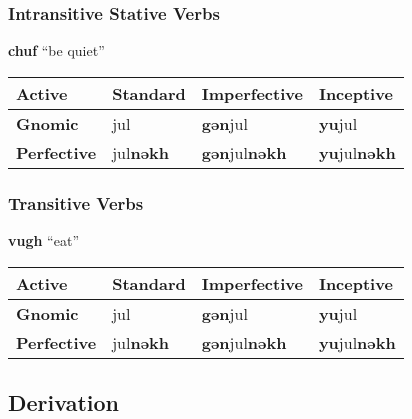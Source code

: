 \documentclass[oneside]{book}
\begin{document}
\subsubsection{Intransitive Stative Verbs}

\textbf{chuf} ``be quiet''

\begin{center}
\begin{tabular}{|l|l|l|l|}\hline
\textbf{Active}&\textbf{Standard}&\textbf{Imperfective}&\textbf{Inceptive}\\\hline
\textbf{Gnomic}&jul&\textbf{gǝn}jul&\textbf{yu}jul\\\hline
\textbf{Perfective}&jul\textbf{nǝkh}&\textbf{gǝn}jul\textbf{nǝkh}&\textbf{yu}jul\textbf{nǝkh}\\\hline
\end{tabular}
\end{center}

\subsubsection{Transitive Verbs}

\textbf{vugh} ``eat''

\begin{center}
\begin{tabular}{|l|l|l|l|}\hline
\textbf{Active}&\textbf{Standard}&\textbf{Imperfective}&\textbf{Inceptive}\\\hline
\textbf{Gnomic}&jul&\textbf{gǝn}jul&\textbf{yu}jul\\\hline
\textbf{Perfective}&jul\textbf{nǝkh}&\textbf{gǝn}jul\textbf{nǝkh}&\textbf{yu}jul\textbf{nǝkh}\\\hline
\end{tabular}
\end{center}

\subsection{Derivation}
\end{document}
